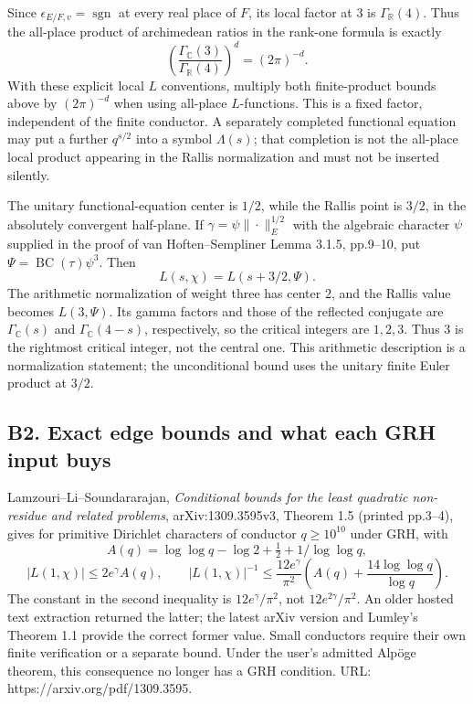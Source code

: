 Since \(\epsilon_{E/F,v}=\operatorname{sgn}\) at every real place of \(F\), its local factor at \(3\) is \(\Gamma_{\mathbb R}(4)\). Thus the all-place product of archimedean ratios in the rank-one formula is exactly \[
 \left(\frac{\Gamma_{\mathbb C}(3)}{\Gamma_{\mathbb R}(4)}\right)^d
 =(2\pi)^{-d}.
\tag{B1a.2}
\] With these explicit local \(L\) conventions, multiply both finite-product bounds above by \((2\pi)^{-d}\) when using all-place \(L\)-functions. This is a fixed factor, independent of the finite conductor. A separately completed functional equation may put a further \(q^{s/2}\) into a symbol \(\Lambda(s)\); that completion is not the all-place local product appearing in the Rallis normalization and must not be inserted silently.

The unitary functional-equation center is \(1/2\), while the Rallis point is \(3/2\), in the absolutely convergent half-plane. If \(\gamma=\psi\|\cdot\|_E^{1/2}\) with the algebraic character \(\psi\) supplied in the proof of van Hoften--Sempliner Lemma 3.1.5, pp.9--10, put \(\Psi=\operatorname{BC}(\tau)\psi^3\). Then \[
 L(s,\chi)=L(s+3/2,\Psi).
\] The arithmetic normalization of weight three has center \(2\), and the Rallis value becomes \(L(3,\Psi)\). Its gamma factors and those of the reflected conjugate are \(\Gamma_{\mathbb C}(s)\) and \(\Gamma_{\mathbb C}(4-s)\), respectively, so the critical integers are \(1,2,3\). Thus \(3\) is the rightmost critical integer, not the central one. This arithmetic description is a normalization statement; the unconditional bound uses the unitary finite Euler product at \(3/2\).

\subsection{B2. Exact edge bounds and what each GRH input buys}\label{b2.-exact-edge-bounds-and-what-each-grh-input-buys}

Lamzouri--Li--Soundararajan, \emph{Conditional bounds for the least quadratic non-residue and related problems}, arXiv:1309.3595v3, Theorem 1.5 (printed pp.3--4), gives for primitive Dirichlet characters of conductor \(q\geq10^{10}\) under GRH, with \[
 A(q)=\log\log q-\log2+\tfrac12+1/\log\log q,
\] \[
 |L(1,\chi)|\leq 2e^\gamma A(q),\qquad
 |L(1,\chi)|^{-1}\leq\frac{12e^\gamma}{\pi^2}
 \left(A(q)+\frac{14\log\log q}{\log q}\right).
\] The constant in the second inequality is \(12e^\gamma/\pi^2\), not \(12e^{2\gamma}/\pi^2\). An older hosted text extraction returned the latter; the latest arXiv version and Lumley's Theorem 1.1 provide the correct former value. Small conductors require their own finite verification or a separate bound. Under the user's admitted Alpöge theorem, this consequence no longer has a GRH condition. URL: https://arxiv.org/pdf/1309.3595.

